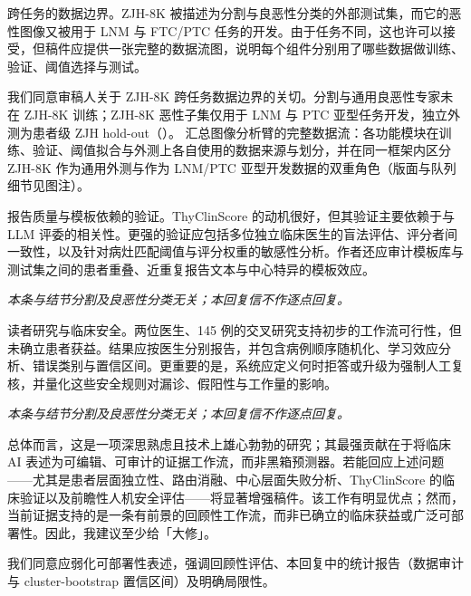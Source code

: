 \begin{reviewercomment}
跨任务的数据边界。ZJH-8K 被描述为分割与良恶性分类的外部测试集，而它的恶性图像又被用于 LNM 与 FTC/PTC 任务的开发。由于任务不同，这也许可以接受，但稿件应提供一张完整的数据流图，说明每个组件分别用了哪些数据做训练、验证、阈值选择与测试。
\end{reviewercomment}
\begin{authorresponse}
我们同意审稿人关于 ZJH-8K 跨任务数据边界的关切。分割与通用良恶性专家未在 ZJH-8K 训练；ZJH-8K 恶性子集仅用于 LNM 与 PTC 亚型任务开发，独立外测为患者级 ZJH hold-out（）。 汇总图像分析臂的完整数据流：各功能模块在训练、验证、阈值拟合与外测上各自使用的数据来源与划分，并在同一框架内区分 ZJH-8K 作为通用外测与作为 LNM/PTC 亚型开发数据的双重角色（版面与队列细节见图注）。\par
\par
\end{authorresponse}

\begin{reviewercomment}
报告质量与模板依赖的验证。ThyClinScore 的动机很好，但其验证主要依赖于与 LLM 评委的相关性。更强的验证应包括多位独立临床医生的盲法评估、评分者间一致性，以及针对病灶匹配阈值与评分权重的敏感性分析。作者还应审计模板库与测试集之间的患者重叠、近重复报告文本与中心特异的模板效应。
\end{reviewercomment}
\begin{authorresponse}
\noindent\textit{本条与结节分割及良恶性分类无关；本回复信不作逐点回复。}
\end{authorresponse}

\begin{reviewercomment}
读者研究与临床安全。两位医生、145 例的交叉研究支持初步的工作流可行性，但未确立患者获益。结果应按医生分别报告，并包含病例顺序随机化、学习效应分析、错误类别与置信区间。更重要的是，系统应定义何时拒答或升级为强制人工复核，并量化这些安全规则对漏诊、假阳性与工作量的影响。
\end{reviewercomment}
\begin{authorresponse}
\noindent\textit{本条与结节分割及良恶性分类无关；本回复信不作逐点回复。}
\end{authorresponse}

\begin{reviewercomment}
总体而言，这是一项深思熟虑且技术上雄心勃勃的研究；其最强贡献在于将临床 AI 表述为可编辑、可审计的证据工作流，而非黑箱预测器。若能回应上述问题——尤其是患者层面独立性、路由消融、中心层面失败分析、ThyClinScore 的临床验证以及前瞻性人机安全评估——将显著增强稿件。该工作有明显优点；然而，当前证据支持的是一条有前景的回顾性工作流，而非已确立的临床获益或广泛可部署性。因此，我建议至少给「大修」。
\end{reviewercomment}
\begin{authorresponse}
我们同意应弱化可部署性表述，强调回顾性评估、本回复中的统计报告（数据审计与 cluster-bootstrap 置信区间）及明确局限性。\par
\end{authorresponse}


